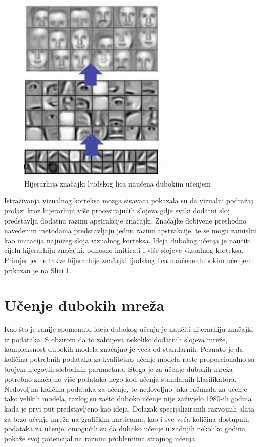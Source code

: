 \documentclass[lmodern, utf8, diplomski, numeric]{fer}
\begin{document}
\begin{figure}[ht!]
\centering
\includegraphics[height=9cm]{slike/feature_hierarchy.png}
\caption{Hijerarhija značajki ljudskog lica naučena dubokim učenjem}
\label{fig:hierarchy}
\end{figure}

Istraživanja vizualnog korteksa mozga sisavaca pokazala su da vizualni podražaj prolazi kroz hijerarhiju više procesirajućih slojeva gdje svaki dodatni sloj predstavlja dodatnu razinu apstrakcije značajki.  Značajke dobivene prethodno navedenim metodama predstavljaju jednu razinu apstrakcije, te se mogu zamisliti kao imitacija najnižeg sloja vizualnog korteksa. Ideja dubokog učenja je naučiti cijelu hijerarhiju značajki, odnosno imitirati i više slojeve vizualnog korteksa. Primjer jedne takve hijerarhije značajki ljudskog lica naučene dubokim učenjem prikazan je na Slici \ref{fig:hierarchy}.


\section{Učenje dubokih mreža}

Kao što je ranije spomenuto ideja dubokog učenja je naučiti hijerarhiju značajki iz podataka. S obzirom da to zahtijeva nekoliko dodatnih slojeva mreže, kompleksnost dubokih modela značajno je veća od standarnih. Poznato je da količina potrebnih podataka za kvalitetno učenje modela raste proporcionalno sa brojem njegovih slobodnih parametara. Stoga je za učenje dubokih mreža potrebno značajno više podataka nego kod učenja standarnih klasifikatora. Nedovoljna količina podataka za učenje, te nedovoljno jaka računala za učenje tako velikih modela, razlog su zašto duboko učenje nije zaživjelo 1980-ih godina kada je prvi put predstavljeno kao ideja. Dolazak specijaliziranih razvojnih alata za brzo učenje mreža na grafičkim karticama, kao i sve veća količina dostupnih podataka za učenje, omogućili su da duboko učenje u zadnjih nekoliko godina pokaže svoj potencijal na raznim problemima strojnog učenja.
\end{document}
